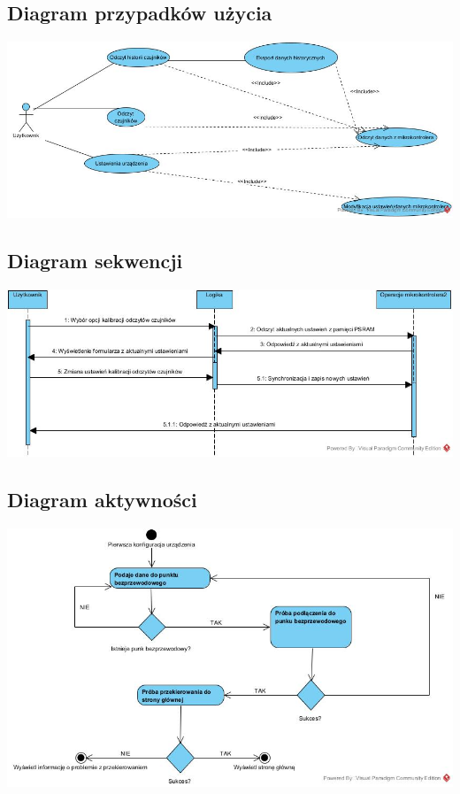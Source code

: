 \documentclass[12pt,a4paper]{article}
\begin{document}
\subsection{Diagram przypadków użycia}
\includegraphics[width=\textwidth, center]{use-case-diagram-1.jpg}

\subsection{Diagram sekwencji}
\includegraphics[width=\textwidth, center]{sequence-diagram-2.jpg}

\subsection{Diagram aktywności}
\includegraphics[width=\textwidth, center]{activity-diagram.jpg}
\end{document}
